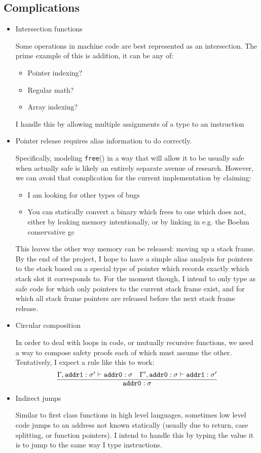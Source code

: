 \documentclass{article}
\begin{document}
\subsection{Complications}
\begin{itemize}
  \item Intersection functions

    Some operations in machine code are best represented as an intersection.
    The prime example of this is addition, it can be any of:
    \begin{itemize}
      \item Pointer indexing?
      \item Regular math?
      \item Array indexing?
    \end{itemize}
    I handle this by allowing multiple assignments of a type to an instruction
  \item Pointer release requires alias information to do correctly.

    Specifically, modeling \texttt{free}() in a way that will allow it to be usually safe when actually safe is likely an entirely separate avenue of research. However, we can avoid that complication for the current implementation by claiming:
    \begin{itemize}
      \item I am looking for other types of bugs
      \item You can statically convert a binary which frees to one which does not, either by leaking memory intentionally, or by linking in e.g. the Boehm conservative gc
    \end{itemize}

    This leaves the other way memory can be released: moving up a stack frame.
    By the end of the project, I hope to have a simple alias analysis for pointers to the stack based on a special type of pointer which records exactly which stack slot it corresponds to.
    For the moment though, I intend to only type as safe code for which only pointers to the current stack frame exist, and for which all stack frame pointers are released before the next stack frame release.

  \item Circular composition

    In order to deal with loops in code, or mutually recursive functions, we need a way to compose safety proofs each of which must assume the other. Tentatively, I expect a rule like this to work:
    \[
      \infer{\texttt{addr0} : \sigma}{\Gamma, \texttt{addr1} : \sigma' \vdash \texttt{addr0} : \sigma & \Gamma', \texttt{addr0} : \sigma \vdash \texttt{addr1} : \sigma'}
    \]

  \item Indirect jumps

    Similar to first class functions in high level languages, sometimes low level code jumps to an address not known statically (usually due to return, case splitting, or function pointers).
    I intend to handle this by typing the value it is to jump to the same way I type instructions.
\end{itemize}
\end{document}
